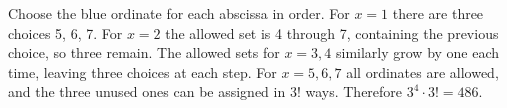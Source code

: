 Choose the blue ordinate for each abscissa in order. For $x=1$ there are three choices 5, 6, 7. For $x=2$ the allowed set is 4 through 7, containing the previous choice, so three remain. The allowed sets for $x=3,4$ similarly grow by one each time, leaving three choices at each step. For $x=5,6,7$ all ordinates are allowed, and the three unused ones can be assigned in $3!$ ways. Therefore $\boxed{3^4\cdot3!=486}$.
